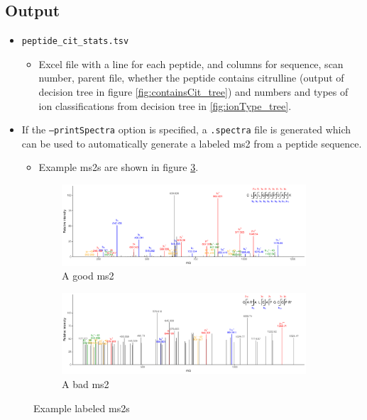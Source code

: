 \documentclass[12pt]{article}
\begin{document}

	\subsection{Output} %
	\label{sub:output}

	\begin{itemize}
		\item \texttt{peptide\_cit\_stats.tsv}
		\begin{itemize}
			\item Excel file with a line for each peptide, and columns for sequence, scan number, parent file, whether the peptide contains citrulline (output of decision tree in figure \ref{fig:containsCit_tree}) and numbers and types of ion classifications from decision tree in \ref{fig:ionType_tree}.  
		\end{itemize}

		\item If the \texttt{--printSpectra} option is specified, a \texttt{.spectra} file is generated which can be used to automatically generate a labeled ms2 from a peptide sequence.
		\begin{itemize}
			\item Example ms2s are shown in figure \ref{fig:ms2s}.
		\end{itemize}
	\end{itemize}

	\begin{figure}
		\centering
		\begin{subfigure}[b]{1\textwidth}
			\includegraphics[width=\textwidth]{ror_pad_hr_CLALGMSRDAVK_6914_2.pdf}
			\caption{A good ms2}
			\label{sfig:good_ms2}
		\end{subfigure}

		\begin{subfigure}[b]{1\textwidth}
			\includegraphics[width=\textwidth]{gat_pad_hr_GARALEAPGCGPR_11060_3.pdf}
			\caption{A bad ms2}
			\label{sfig:bad_ms2}
		\end{subfigure}

		\caption{Example labeled ms2s}
		\label{fig:ms2s}
	\end{figure}
	
\end{document}
